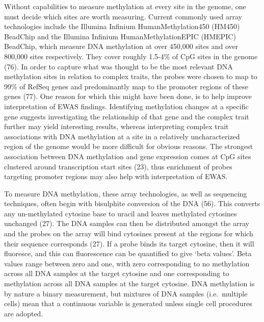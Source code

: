 \documentclass[11pt,oneside]{bristolthesis}
\begin{document}
Without capabilities to measure methylation at every site in the genome, one must decide which sites are worth measuring. Current commonly used array technologies include the Illumina Infinium HumanMethylation450 (HM450) BeadChip and the Illumina Infinium HumanMethylationEPIC (HMEPIC) BeadChip, which measure DNA methylation at over 450,000 sites and over 800,000 sites respectively. They cover roughly 1.5-4\% of CpG sites in the genome (76). In order to capture what was thought to be the most relevant DNA methylation sites in relation to complex traits, the probes were chosen to map to 99\% of RefSeq genes and predominantly map to the promoter regions of these genes (77). One reason for which this might have been done, is to help improve interpretation of EWAS findings. Identifying methylation changes at a specific gene suggests investigating the relationship of that gene and the complex trait further may yield interesting results, whereas interpreting complex trait associations with DNA methylation at a site in a relatively uncharacterized region of the genome would be more difficult for obvious reasons. The strongest association between DNA methylation and gene expression comes at CpG sites clustered around transcription start sites (23), thus enrichment of probes targeting promoter regions may also help with interpretation of EWAS.

To measure DNA methylation, these array technologies, as well as sequencing techniques, often begin with bisulphite conversion of the DNA (56). This converts any un-methylated cytosine base to uracil and leaves methylated cytosines unchanged (27). The DNA samples can then be distributed amongst the array and the probes on the array will bind cytosines present at the regions for which their sequence corresponds (27). If a probe binds its target cytosine, then it will fluoresce, and this can fluorescence can be quantified to give `beta values'. Beta values range between zero and one, with zero corresponding to no methylation across all DNA samples at the target cytosine and one corresponding to methylation across all DNA samples at the target cytosine. DNA methylation is by nature a binary measurement, but mixtures of DNA samples (i.e.~multiple cells) mean that a continuous variable is generated unless single cell procedures are adopted.
\end{document}
